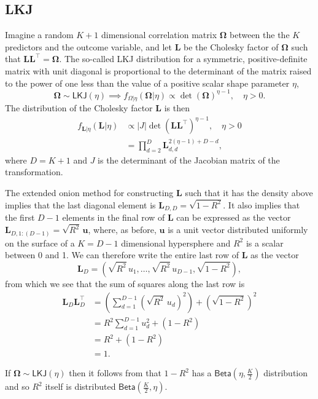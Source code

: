 \documentclass[11pt]{article}
\newcommand{\boldOmega}{\boldsymbol{\Omega}}
\renewcommand{\L}{\mathbf{L}}
\renewcommand{\u}{\mathbf{u}}
\newcommand{\halfK}{\frac{K}{2}}
\newcommand{\Betadist}[2]{\mathsf{Beta}\left(#1,#2\right)}
\begin{document}
\clearpage
\begin{appendix}

\section{LKJ}
\label{appendix:lkj}

Imagine a random $K+1$ dimensional correlation matrix $\boldOmega$ between the
the $K$ predictors and the outcome variable, and let $\L$ be the Cholesky factor
of $\boldOmega$ such that $\L\L^\top = \boldOmega$. The so-called LKJ
distribution \cite{lkj, stan} for a symmetric, positive-definite matrix with
unit diagonal is proportional to the determinant of the matrix raised to the
power of one less than the value of a positive scalar shape parameter $\eta$,
%
$$
\boldOmega \sim \mathsf{LKJ}(\eta) \implies
f_{\Omega|\eta}(\boldOmega | \eta) \propto \det{(\boldOmega)}^{\eta - 1},
\quad \eta > 0.
$$
%
The distribution of the Cholesky factor $\L$ is then
%
\begin{align*}
f_{\L|\eta}(\L | \eta)
&\propto \left|J\right| \det{(\L\L^\top)}^{\eta - 1}, \quad \eta > 0 \\
&= \prod_{d=2}^D \L_{d,d}^{2(\eta -1) + D - d},
\end{align*}
%
where $D = K+1$ and $J$ is the determinant of the Jacobian matrix of the
transformation.

The extended onion method \cite{lkj} for constructing $\L$ such that it has the
density above implies that the last diagonal element is $\L_{D,D} = \sqrt{1 -
R^2}$. It also implies that the first $D-1$ elements in the final row of $\L$
can be expressed as the vector $\L_{D,1:(D-1)} = \sqrt{R^2}\,\u$, where, as
before, $\u$ is a unit vector distributed uniformly on the surface of a $K =
D-1$ dimensional hypersphere and $R^2$ is a scalar between 0 and 1. We can
therefore write the entire last row of $\L$ as the vector
%
$$
\L_D = \left(\sqrt{R^2}\, u_1, \dots, \sqrt{R^2}\,u_{D-1}, \sqrt{1 - R^2}\right),
$$
%
from which we see that the sum of squares along the last row is
%
\begin{align*}
 \L_D \L_D^\top
 &= \left(\sum_{d=1}^{D-1} \left(\sqrt{R^2}\,u_d\right)^2\right) +
  \left(\sqrt{1 - R^2}\right)^2 \\
 &= R^2 \sum_{d=1}^{D-1} u_d^2 + (1 - R^2) \\
 &= R^2 + (1 - R^2) \\
 &= 1.
\end{align*}

If $\boldOmega \sim \mathsf{LKJ}(\eta)$ then it follows from  that
$1 - R^2$ has a $\Betadist{\eta}{\halfK}$ distribution and so $R^2$ itself
is distributed $\Betadist{\halfK}{\eta}$.

\end{appendix}


\end{document}
